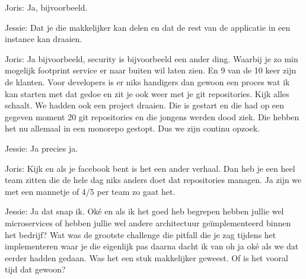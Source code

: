 Joris: Ja, bijvoorbeeld.

Jessie: Dat je die makkelijker kan delen en dat de rest van de applicatie in een instance kan draaien.

Joris: Ja bijvoorbeeld, security is bijvoorbeeld een ander ding. Waarbij je zo min mogelijk footprint service er naar buiten wil laten zien. En 9 van de 10 keer zijn de klanten. Voor developers is er niks handigers dan gewoon een proces wat ik kan starten met dat gedoe en zit je ook weer met je git repositories. Kijk alles schaalt. We hadden ook een project draaien. Die is gestart en die had op een gegeven moment 20 git repositories en die jongens werden dood ziek. Die hebben het nu allemaal in een monorepo gestopt. Dus we zijn continu opzoek.

Jessie: Ja precies ja.

Joris: Kijk en als je facebook bent is het een ander verhaal. Dan heb je een heel team zitten die de hele dag niks anders doet dat repositories managen. Ja zijn we met een mannetje of 4/5 per team zo gaat het.

Jessie: Ja dat snap ik. Oké en als ik het goed heb begrepen hebben jullie wel microservices of hebben jullie wel andere architectuur geïmplementeerd binnen het bedrijf? Wat was de grootste challenge die pitfall die je zag tijdens het implementeren waar je die eigenlijk pas daarna dacht ik van oh ja oké als we dat eerder hadden gedaan. Was het een stuk makkelijker geweest. Of is het vooral tijd dat gewoon?

